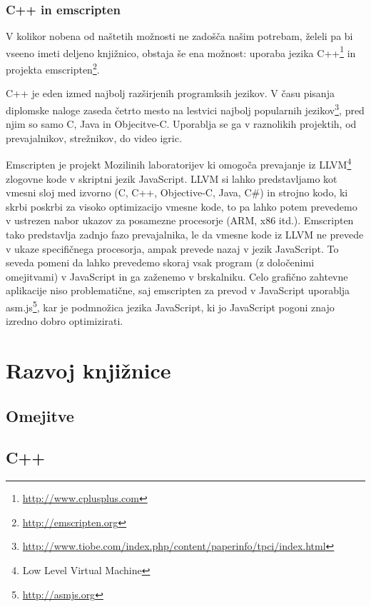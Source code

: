 \subsection{C++ in emscripten}

V kolikor nobena od naštetih možnosti ne zadošča našim potrebam, želeli pa bi vseeno imeti deljeno knjižnico, obstaja še ena možnost: uporaba jezika C++\footnote{\href{http://www.cplusplus.com}{http://www.cplusplus.com}} in projekta emscripten\footnote{\href{http://emscripten.org}{http://emscripten.org}}.

C++ je eden izmed najbolj razširjenih programksih jezikov. V času pisanja diplomske naloge zaseda četrto mesto na lestvici najbolj popularnih jezikov\footnote{\href{http://www.tiobe.com/index.php/content/paperinfo/tpci/index.html}{http://www.tiobe.com/index.php/content/paperinfo/tpci/index.html}}, pred njim so samo C, Java in Objecitve-C. Uporablja se ga v raznolikih projektih, od prevajalnikov, strežnikov, do video igric.

Emscripten je projekt Mozilinih laboratorijev ki omogoča prevajanje iz LLVM\footnote{Low Level Virtual Machine} zlogovne kode v skriptni jezik JavaScript. LLVM si lahko predstavljamo kot vmesni sloj med izvorno (C, C++, Objective-C, Java, C\#) in strojno kodo, ki skrbi poskrbi za visoko optimizacijo vmesne kode, to pa lahko potem prevedemo v ustrezen nabor ukazov za posamezne procesorje (ARM, x86 itd.). Emscripten tako predstavlja zadnjo fazo prevajalnika, le da vmesne kode iz LLVM ne prevede v ukaze specifičnega procesorja, ampak prevede nazaj v jezik JavaScript. To seveda pomeni da lahko prevedemo skoraj vsak program (z določenimi omejitvami) v JavaScript in ga zaženemo v brskalniku. Celo grafično zahtevne aplikacije niso problematične, saj emscripten za prevod v JavaScript uporablja asm.js\footnote{\href{http://asmjs.org}{http://asmjs.org}}, kar je podmnožica jezika JavaScript, ki jo JavaScript pogoni znajo izredno dobro optimizirati.

\chapter{Razvoj knjižnice}
\label{chap:development}

\section{Omejitve}

\section{C++}

